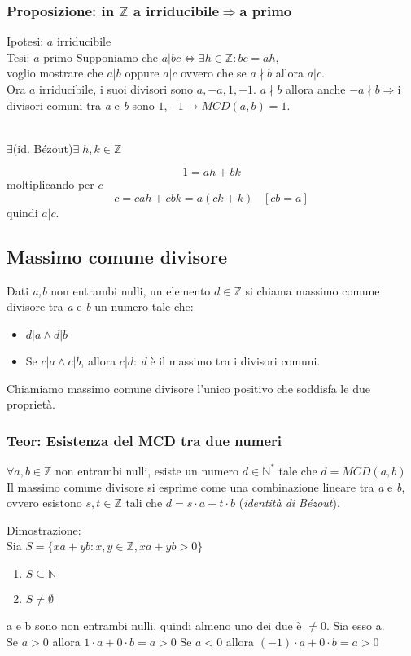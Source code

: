 \subsubsection{Proposizione: in \(\mathbb{Z}\) a irriducibile\(\Rightarrow\)a primo}
Ipotesi: \(a\) irriducibile
\\
Tesi: \(a\) primo
Supponiamo che \(a|bc\Leftrightarrow\exists h\in\mathbb{Z}:bc=ah\),
\\
voglio mostrare che \(a|b\) oppure \(a|c\) ovvero che se \(a\nmid b\) allora \(a|c\).
\\
Ora \(a\) irriducibile, i suoi divisori sono \(a,-a,1,-1\). \(a\nmid b\) allora anche \(-a\nmid b\Rightarrow\)i divisori comuni tra \textit{a} e \textit{b} sono \(1,-1\rightarrow MCD(a,b)=1\).
\\\\
\centerline{\(\exists\)(id. Bézout)\(\exists\; h,k\in\mathbb{Z}\)}
\[1=ah+bk\]
moltiplicando per \(c\)
\[c=cah+cbk=a(ck+k)\;\;\;[cb=a]\]
quindi \(a|c\).

\subsection{Massimo comune divisore}
Dati \textit{a,b} non entrambi nulli, un elemento \(d\in\mathbb{Z}\) si chiama massimo comune divisore tra \textit{a} e \textit{b} un numero tale che:
\begin{itemize}
    \item \(d|a \land d|b\)
    \item Se \(c|a \land c|b\), allora \(c|d\): \textit{d} è il massimo tra i divisori comuni.
\end{itemize}
Chiamiamo massimo comune divisore l'unico positivo che soddisfa le due proprietà.

\subsubsection{Teor: Esistenza del MCD tra due numeri}
\(\forall a,b\in\mathbb{Z}\) non entrambi nulli, esiste un numero \(d\in\mathbb{N^*}\) tale che \(d=MCD(a,b)\)
\\
Il massimo comune divisore si esprime come una combinazione lineare tra \textit{a} e \textit{b}, ovvero esistono \(s, t\in\mathbb{Z}\) tali che \(d=s\cdot a+t\cdot b\) (\textit{identità di Bézout}).

Dimostrazione:
\\
Sia \(S=\{xa+yb:x,y\in\mathbb{Z}, xa+yb>0\}\)
\begin{enumerate}
    \item \(S\subseteq\mathbb{N}\)
    \item \(S\neq\emptyset\)
\end{enumerate}
a e b sono non entrambi nulli, quindi almeno uno dei due è \(\neq 0\).
Sia esso a.
\\
Se \(a>0\) allora \(1\cdot a+0\cdot b=a>0\)
Se \(a<0\) allora \((-1)\cdot a+0\cdot b=a>0\)

